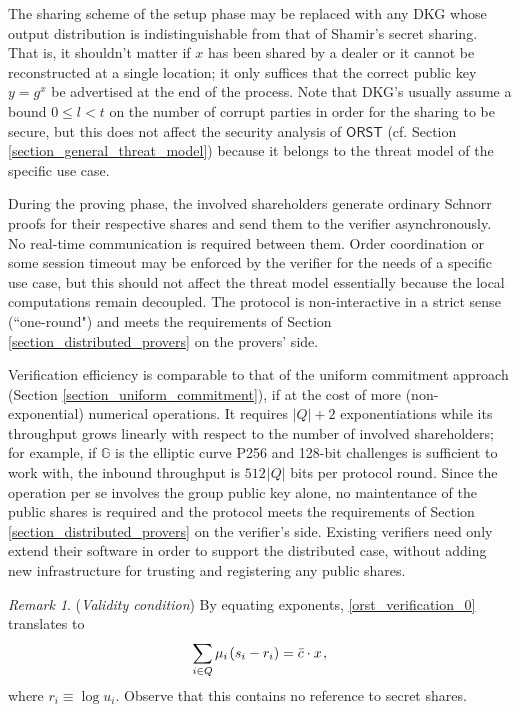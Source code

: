 \documentclass[10pt, psamsfonts, reqno]{amsart}
\theoremstyle{definition}
\theoremstyle{remark}
\newtheorem{rem}[thm]{Remark}
\numberwithin{equation}{section}
\begin{document}
\noindent
The sharing scheme of the setup phase may be replaced
with any DKG whose output distribution
is indistinguishable from that of Shamir's secret sharing.
That is, it shouldn't matter if $x$ has been shared by a dealer
or it cannot be reconstructed at a single location; it only
suffices that the correct public key
$y = g ^ x$ be advertised at the end of the process.
Note that DKG's usually assume a bound $0 \le l < t$
on the number of corrupt parties
in order for the sharing to be secure,
but this does not affect the security analysis of
$\mathsf{ORST}$
(cf. Section \ref{section_general_threat_model})
because it belongs to the threat model of the
specific use case.

During the proving phase,
the involved shareholders generate ordinary Schnorr
proofs for their respective shares
and send them to the verifier asynchronously.
No real-time communication is required between them.
Order coordination or some session timeout
may be enforced by the verifier for the needs of a specific use case,
but this should not affect the threat model essentially
because the local computations remain decoupled.
The protocol is non-interactive in a strict sense
(``one-round") and meets the requirements of
Section \ref{section_distributed_provers} on the provers' side.

Verification efficiency is comparable to that of the uniform
commitment approach (Section \ref{section_uniform_commitment}),
if at the cost of more (non-exponential) numerical operations.
It requires $|Q| + 2$ exponentiations
while its throughput grows linearly
with respect to the number of involved shareholders;
for example, if $\mathbb{G}$ is the elliptic curve P256 and
128-bit challenges is sufficient to work with,
the inbound throughput is $512 \hspace{1pt} |Q|$ bits per protocol round.
Since the operation per se involves
the group public key alone, no maintentance of the public shares is
required and the protocol meets
the requirements of Section \ref{section_distributed_provers}
on the verifier's side.
Existing verifiers need only extend
their software in order to support the distributed case,
without adding new infrastructure
for trusting and registering any public shares.

\begin{rem}\label{rem_orst_verification_exponents}
(\textit{Validity condition})
By equating exponents,
\eqref{orst_verification_0} translates to
\vspace{5pt}
\begin{equation}\label{orst_verification_exponents}
\sum_{i \in Q} \mu_i\hspace{1pt} (s_i - r_i) =
\bar{c} \cdot x\hspace{1pt},
\vspace{5pt}
\end{equation}
where $r_i \equiv \log u_i$.
Observe that this contains no reference to secret shares.
\end{rem}
\end{document}
